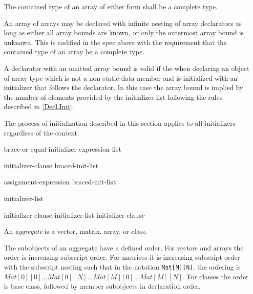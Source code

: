 \p The contained type of an array of either form shall be a complete type.

\begin{note}
  An array of arrays may be declared with infinite nesting of array declarators
  as long as either all array bounds are known, or only the outermost array
  bound is unknown. This is codified in the spec above with the requirement that
  the contained type of an array be a complete type.
\end{note}

\p A declarator with an omitted array bound is valid if the when declaring an
object of array type which is not a non-static data member and is initialized
with an initializer that follows the declarator. In this case the array bound is
implied by the number of elements provided by the initializer list following the
rules described in \ref{Decl.Init}.


\p The process of initialization described in this section applies to all
initializers regardless of the context.

\begin{grammar}
  \br
  brace-or-equal-initializer\br
  \terminal{(} expression-list \terminal{)}\br

  \br
  \terminal{=} initializer-clause\br
  braced-init-list\br

  \br
  assignment-expression\br
  braced-init-list\br

  \br
  \terminal{\{} initializer-list \opt{\terminal{,}} \terminal{\}}\br
  \terminal{\{} \terminal{\}}\br

  \br
  initializer-clause\br
  initializer-list \terminal{,} initializer-clause\br
\end{grammar}


\p An \textit{aggregate} is a vector, matrix, array, or class.

\p The subobjects of an aggregate have a defined order. For vectors and arrays
the order is increasing subscript order. For matrices it is increasing subscript
order with the subscript nesting such that in the notation
\texttt{Mat[M][N]}, the ordering is \(Mat[0][0]...Mat[0][N]...
Mat[M][0]...Mat[M][N]\). For classes the order is base class, followed by member
subobjects in declaration order.

